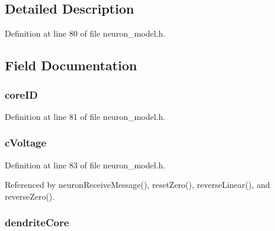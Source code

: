 \subsection{Detailed Description}


Definition at line 80 of file neuron\+\_\+model.\+h.



\subsection{Field Documentation}
\hypertarget{structneuron_state_acc19e6f856ad128cc1f90527d066700b}{}
\subsubsection[{core\+I\+D}]{ core\+I\+D}\label{structneuron_state_acc19e6f856ad128cc1f90527d066700b}


Definition at line 81 of file neuron\+\_\+model.\+h.

\hypertarget{structneuron_state_a83c2516a958f81caedbaf4dd3c431d1b}{}
\subsubsection[{c\+Voltage}]{ c\+Voltage}\label{structneuron_state_a83c2516a958f81caedbaf4dd3c431d1b}


Definition at line 83 of file neuron\+\_\+model.\+h.



Referenced by neuron\+Receive\+Message(), reset\+Zero(), reverse\+Linear(), and reverse\+Zero().

\hypertarget{structneuron_state_ab49277e7f9460fbd698aefa5a44b1b0b}{}
\subsubsection[{dendrite\+Core}]{ dendrite\+Core}\label{structneuron_state_ab49277e7f9460fbd698aefa5a44b1b0b}


